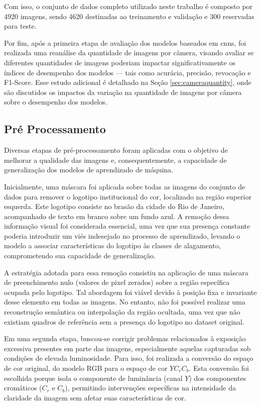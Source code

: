 Com isso, o conjunto de dados completo utilizado neste trabalho é composto por 4920 imagens, sendo 4620 destinadas ao treinamento e validação e 300 reservadas para teste.

Por fim, após a primeira etapa de avaliação dos modelos baseados em \acrshort{cnn}s, foi realizada uma reanálise da quantidade de imagens por câmera, visando avaliar se diferentes quantidades de imagens poderiam impactar significativamente os índices de desempenho dos modelos — tais como acurácia, precisão, revocação e F1-Score. Esse estudo adicional é detalhado na Seção \ref{sec:cameraquantity}, onde são discutidos os impactos da variação na quantidade de imagens por câmera sobre o desempenho dos modelos.
\subsection{Pré Processamento}\label{subsec:datapreprocessing}

Diversas etapas de pré-processamento foram aplicadas com o objetivo de melhorar a qualidade das imagens e, consequentemente, a capacidade de generalização dos modelos de aprendizado de máquina.

Inicialmente, uma máscara foi aplicada sobre todas as imagens do conjunto de dados para remover o logotipo institucional do \acrshort{cor}, localizado na região superior esquerda. Este logotipo consiste no brasão da cidade do Rio de Janeiro, acompanhado de texto em branco sobre um fundo azul. A remoção dessa informação visual foi considerada essencial, uma vez que sua presença constante poderia introduzir um viés indesejado no processo de aprendizado, levando o modelo a associar características do logotipo às classes de alagamento, comprometendo sua capacidade de generalização.

A estratégia adotada para essa remoção consistiu na aplicação de uma máscara de preenchimento nulo (valores de pixel zerados) sobre a região específica ocupada pelo logotipo. Tal abordagem foi viável devido à posição fixa e invariante desse elemento em todas as imagens. No entanto, não foi possível realizar uma reconstrução semântica ou interpolação da região ocultada, uma vez que não existiam quadros de referência sem a presença do logotipo no dataset original.

Em uma segunda etapa, buscou-se corrigir problemas relacionados à exposição excessiva presentes em parte das imagens, especialmente aquelas capturadas sob condições de elevada luminosidade. Para isso, foi realizada a conversão do espaço de cor original, do modelo RGB para o espaço de cor $YC_rC_b$. Esta conversão foi escolhida porque isola o componente de luminância (canal $Y$) dos componentes cromáticos ($C_r$ e $C_b$), permitindo intervenções específicas na intensidade da claridade da imagem sem afetar suas características de cor.

